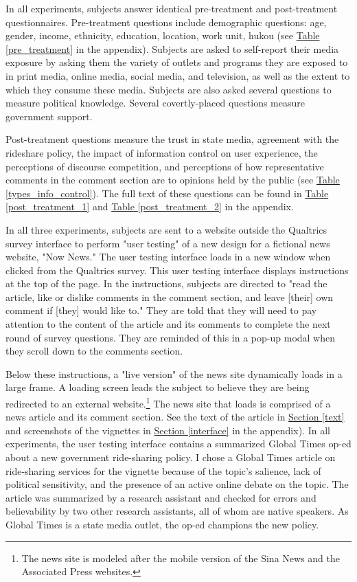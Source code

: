 \documentclass[11pt]{article}
\begin{document}
In all experiments, subjects answer identical pre-treatment and post-treatment questionnaires. Pre-treatment questions include demographic questions: age, gender, income, ethnicity, education, location, work unit, hukou (see \hyperref[pre_treatment]{Table \ref*{pre_treatment}} in the appendix). Subjects are asked to self-report their media exposure by asking them the variety of outlets and programs they are exposed to in print media, online media, social media, and television, as well as the extent to which they consume these media. Subjects are also asked several questions to measure political knowledge. Several covertly-placed questions measure government support.

Post-treatment questions measure the trust in state media, agreement with the rideshare policy, the impact of information control on user experience, the perceptions of discourse competition, and perceptions of how representative comments in the comment section are to opinions held by the public (see \hyperref[types_info_control]{Table \ref*{types_info_control}}). The full text of these questions can be found in \hyperref[post_treatment_1]{Table \ref*{post_treatment_1}} and \hyperref[post_treatment_2]{Table \ref*{post_treatment_2}} in the appendix.

In all three experiments, subjects are sent to a website outside the Qualtrics survey interface to perform "user testing" of a new design for a fictional news website, "Now News." The user testing interface loads in a new window when clicked from the Qualtrics survey. This user testing interface displays instructions at the top of the page. In the instructions, subjects are directed to "read the article, like or dislike comments in the comment section, and leave [their] own comment if [they] would like to." They are told that they will need to pay attention to the content of the article and its comments to complete the next round of survey questions. They are reminded of this in a pop-up modal when they scroll down to the comments section.

Below these instructions, a "live version" of the news site dynamically loads in a large frame. A loading screen leads the subject to believe they are being redirected to an external website.\footnote{The news site is modeled after the mobile version of the Sina News and the Associated Press websites.} The news site that loads is comprised of a news article and its comment section. See the text of the article in \hyperref[text]{Section \ref*{text}} and screenshots of the vignettes in \hyperref[interface]{Section \ref*{interface}} in the appendix). In all experiments, the user testing interface contains a summarized Global Times op-ed about a new government ride-sharing policy. I chose a Global Times article on ride-sharing services for the vignette because of the topic's salience, lack of political sensitivity, and the presence of an active online debate on the topic. The article was summarized by a research assistant and checked for errors and believability by two other research assistants, all of whom are native speakers. As Global Times is a state media outlet, the op-ed champions the new policy.
\end{document}
